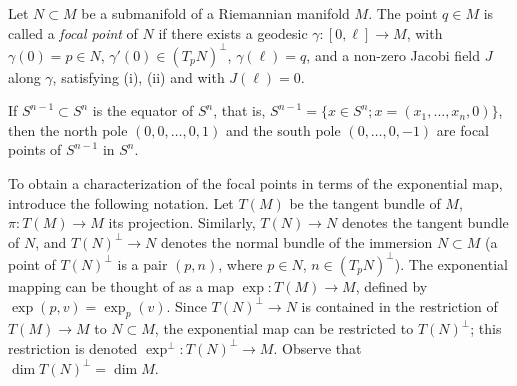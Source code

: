\begin{definition}
  \label{def:dc-ch10-4-2}
  Let $N\subset M$ be a submanifold of a Riemannian manifold $M$. The point $q\in M$
  is called a \emph{focal point} of $N$ if there exists a geodesic
  $\gamma:[0,\ell]\to M$, with $\gamma(0)=p\in N$, $\gamma'(0)\in(T_pN)^\perp$,
  $\gamma(\ell)=q$, and a non-zero Jacobi field $J$ along $\gamma$, satisfying (i),
  (ii) and with $J(\ell)=0$.
\end{definition}

\begin{example}[Example 4.3]
  \label{ex:dc-ch10-4-3}
  If $S^{n-1}\subset S^n$ is the equator of $S^n$, that is,
  $S^{n-1}=\{x\in S^n;x=(x_1,\dots,x_n,0)\}$, then the north pole $(0,0,\dots,0,1)$
  and the south pole $(0,\dots,0,-1)$ are focal points of $S^{n-1}$ in $S^n$.
  
  To obtain a characterization of the focal points in terms of the exponential map,
  introduce the following notation. Let $T(M)$ be the tangent bundle of $M$,
  $\pi:T(M)\to M$ its projection. Similarly, $T(N)\to N$ denotes the tangent bundle
  of $N$, and $T(N)^\perp\to N$ denotes the normal bundle of the immersion
  $N\subset M$ (a point of $T(N)^\perp$ is a pair $(p,n)$, where $p\in N$,
  $n\in(T_pN)^\perp$). The exponential mapping can be thought of as a map
  $\exp:T(M)\to M$, defined by $\exp(p,v)=\exp_p(v)$. Since $T(N)^\perp\to N$ is
  contained in the restriction of $T(M)\to M$ to $N\subset M$, the exponential map
  can be restricted to $T(N)^\perp$; this restriction is denoted
  $\exp^\perp:T(N)^\perp\to M$. Observe that $\dim T(N)^\perp=\dim M$.
\end{example}

